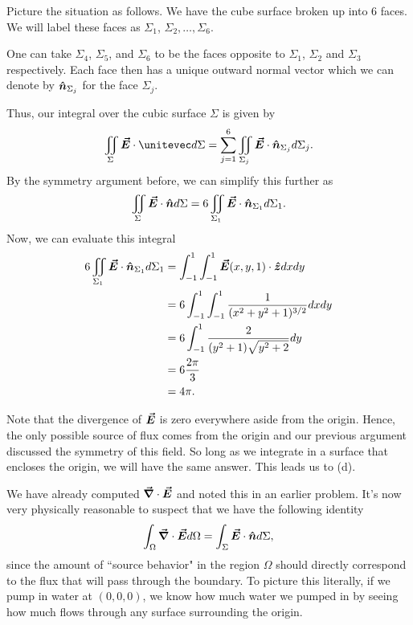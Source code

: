\documentclass[12pt]{article} %
\begin{document}
\begin{solution}
\begin{enumerate}[(a)]
        Picture the situation as follows. We have the cube surface broken up into $6$ faces. We will label these faces as $\Sigma_1$, $\Sigma_2,\dots,\Sigma_6$.  
        \begin{figure}[H]
        	\centering
        	\def\svgwidth{0.75\columnwidth}
        	
        \end{figure}
        One can take $\Sigma_4$, $\Sigma_5$, and $\Sigma_6$ to be the faces opposite to $\Sigma_1$, $\Sigma_2$ and $\Sigma_3$ respectively.  Each face then has a unique outward normal vector which we can denote by $\boldsymbol{\hat{n}}_{\Sigma_j}$ for the face $\Sigma_j$.
        \begin{figure}[H]
        	\centering
        	\def\svgwidth{0.75\columnwidth}
        	
        \end{figure}
        Thus, our integral over the cubic surface $\Sigma$ is given by
        \[
        \iint_{\Sigma} \vecfieldE \cdot \unitevec d\Sigma = \sum_{j=1}^6 \iint_{\Sigma_j} \vecfieldE \cdot \unitvec_{\Sigma_j}d\Sigma_j.
        \]
        By the symmetry argument before, we can simplify this further as
        \[
        \iint_\Sigma \boldsymbol{\vec{E}} \cdot \boldsymbol{\hat{n}} d\Sigma = 6 \iint_{\Sigma_1} \boldsymbol{\vec{E}} \cdot \boldsymbol{\hat{n}}_{\Sigma_1}d\Sigma_1.
        \]
        Now, we can evaluate this integral
        \begin{align*}
            6\iint_{\Sigma_1} \boldsymbol{\vec{E}} \cdot \boldsymbol{\hat{n}}_{\Sigma_1}d\Sigma_1 &= \int_{-1}^1 \int_{-1}^1 \boldsymbol{\vec{E}}(x,y,1) \cdot \boldsymbol{\hat{z}} dxdy\\&= 6\int_{-1}^1 \int_{-1}^1 \frac{1}{(x^2+y^2+1)^{3/2}}dxdy\\
                &= 6\int_{-1}^1 \frac{2}{(y^2+1)\sqrt{y^2+2}} dy\\
                &= 6\frac{2\pi }{3}\\
                &= 4\pi.
        \end{align*}
    \end{enumerate}
    \item Note that the divergence of $\boldsymbol{\vec{E}}$ is zero everywhere aside from the origin.  Hence, the only possible source of flux comes from the origin and our previous argument discussed the symmetry of this field.  So long as we integrate in a surface that encloses the origin, we will have the same answer.  This leads us to (d).
    \item We have already computed $\boldsymbol{\vec{\nabla}} \cdot \boldsymbol{\vec{E}}$ and noted this in an earlier problem.  It's now very physically reasonable to suspect that we have the following identity
    \[
    \int_\Omega \boldsymbol{\vec{\nabla}} \cdot \boldsymbol{\vec{E}} d\Omega = \int_\Sigma \boldsymbol{\vec{E}} \cdot \boldsymbol{\hat{n}} d\Sigma,
    \]
    since the amount of ``source behavior" in the region $\Omega$ should directly correspond to the flux that will pass through the boundary.  To picture this literally, if we pump in water at $(0,0,0)$, we know how much water we pumped in by seeing how much flows through any surface surrounding the origin.  
    

\end{solution}
\end{document}
